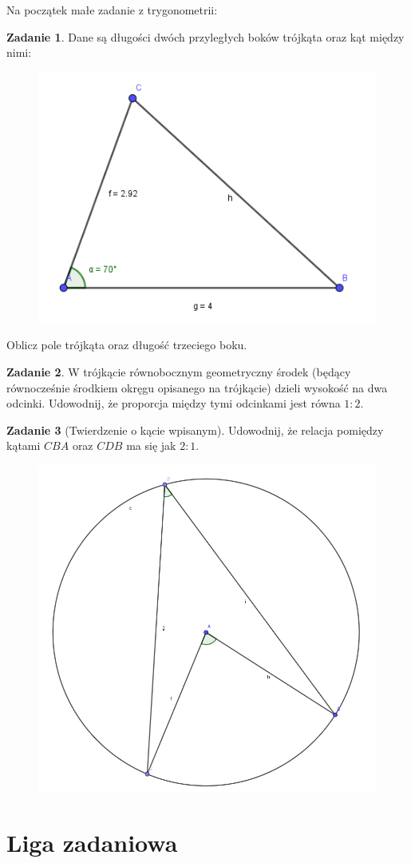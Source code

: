 \documentclass[11pt]{article}
\theoremstyle{definition}
\newtheorem{zad}{Zadanie}
\numberwithin{zad}{section}
\begin{document}
Na początek małe zadanie z trygonometrii:

\begin{zad}
Dane są długości dwóch przyległych boków trójkąta oraz kąt między nimi:

\begin{figure}[h]
\centering
\includegraphics[width=0.5\linewidth]{triangle.png}
\end{figure}
Oblicz pole trójkąta oraz długość trzeciego boku.
\end{zad}

\begin{zad}
W trójkącie równobocznym geometryczny środek (będący równocześnie środkiem okręgu opisanego na trójkącie) dzieli wysokość na dwa odcinki. Udowodnij, że proporcja między tymi odcinkami jest równa $1:2$.
\end{zad}

\begin{zad}[Twierdzenie o kącie wpisanym] Udowodnij, że relacja pomiędzy kątami $CBA$ oraz $CDB$ ma się jak $2:1$.
\begin{figure}[h]
\centering
\includegraphics[width=0.5\linewidth]{circle.png}
\end{figure}
\end{zad}

\section{Liga zadaniowa}
\end{document}
